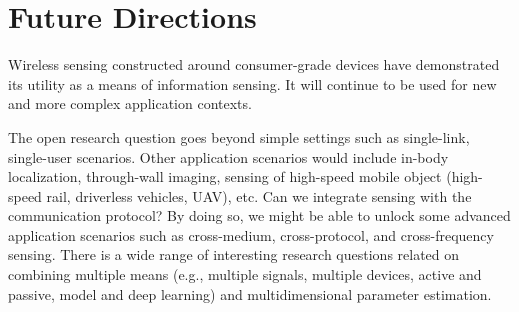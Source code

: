 \section{Future Directions}

Wireless sensing constructed around consumer-grade devices have demonstrated its utility as a means of information sensing. It will
continue to be used for new and more complex application contexts.

The open research question goes beyond simple settings such as single-link, single-user scenarios. Other application scenarios would
include in-body localization, through-wall imaging, sensing of high-speed mobile object (high-speed rail, driverless vehicles, UAV), etc.
Can we integrate sensing with the communication protocol? By doing so, we might be able to unlock some advanced application scenarios such
as cross-medium, cross-protocol, and cross-frequency sensing. There is a wide range of interesting research questions related on combining
multiple means (e.g., multiple signals, multiple devices, active and passive, model and deep learning) and multidimensional parameter
estimation.
